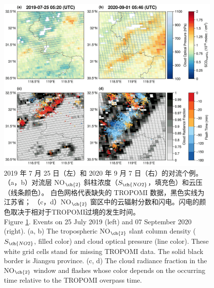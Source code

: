 \begin{figure}[H]
    \centering
    \includegraphics[width=\textwidth]{./figures/china_flash_scd.png}
    \caption{
    2019 年 7 月 25 日（左）和 2020 年 9 月 7 日（右）的对流个例。
    （a，b）对流层 NO$_{\ch{2}}$ 斜柱浓度（$S_{\ch{NO2}}$，填充色）和云压（线条颜色）。
    白色网格代表缺失的 TROPOMI 数据，黑色实线为江苏省；
    （c，d）NO$_{\ch{2}}$ 窗区中的云辐射分数和闪电。闪电的颜色取决于相对于TROPOMI过境的发生时间。\\
    Figure \ref{fig:china_flash_scd}. Events on 25 July 2019 (left) and 07 September 2020 (right).
    (a, b) The tropospheric NO$_{\ch{2}}$ slant column density ($S_{\ch{NO2}}$, filled color) and cloud optical pressure (line color).
    These white grid cells stand for missing TROPOMI data.
    The solid black border is Jiangsu province.
    (c, d) The cloud radiance fraction in the NO$_{\ch{2}}$ window and flashes whose color depends on the occurring time relative to the TROPOMI overpass time.
    }
    \label{fig:china_flash_scd}
\end{figure}


